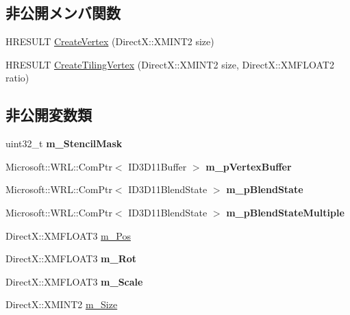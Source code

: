 \subsection*{非公開メンバ関数}
\begin{DoxyCompactItemize}
\item 
H\+R\+E\+S\+U\+LT \hyperlink{class_a_p_i_1_1_sprite_a8629113e859e0772382f67b6de6036bc}{Create\+Vertex} (Direct\+X\+::\+X\+M\+I\+N\+T2 size)
\item 
H\+R\+E\+S\+U\+LT \hyperlink{class_a_p_i_1_1_sprite_acc51e83897641c917cf8e2883519bd7c}{Create\+Tiling\+Vertex} (Direct\+X\+::\+X\+M\+I\+N\+T2 size, Direct\+X\+::\+X\+M\+F\+L\+O\+A\+T2 ratio)
\end{DoxyCompactItemize}
\subsection*{非公開変数類}
\begin{DoxyCompactItemize}
\item 
uint32\+\_\+t {\bfseries m\+\_\+\+Stencil\+Mask}\hypertarget{class_a_p_i_1_1_sprite_a14c9f660773821f8d9005b415e1b9c78}{}\label{class_a_p_i_1_1_sprite_a14c9f660773821f8d9005b415e1b9c78}

\item 
Microsoft\+::\+W\+R\+L\+::\+Com\+Ptr$<$ I\+D3\+D11\+Buffer $>$ {\bfseries m\+\_\+p\+Vertex\+Buffer}\hypertarget{class_a_p_i_1_1_sprite_aefe7709234a1ba240773c9794032a88c}{}\label{class_a_p_i_1_1_sprite_aefe7709234a1ba240773c9794032a88c}

\item 
Microsoft\+::\+W\+R\+L\+::\+Com\+Ptr$<$ I\+D3\+D11\+Blend\+State $>$ {\bfseries m\+\_\+p\+Blend\+State}\hypertarget{class_a_p_i_1_1_sprite_a63001d1ec2d9ac02687c99306af4a07f}{}\label{class_a_p_i_1_1_sprite_a63001d1ec2d9ac02687c99306af4a07f}

\item 
Microsoft\+::\+W\+R\+L\+::\+Com\+Ptr$<$ I\+D3\+D11\+Blend\+State $>$ {\bfseries m\+\_\+p\+Blend\+State\+Multiple}\hypertarget{class_a_p_i_1_1_sprite_a05d37dc5f363ce48454bc3bd9b508d9f}{}\label{class_a_p_i_1_1_sprite_a05d37dc5f363ce48454bc3bd9b508d9f}

\item 
Direct\+X\+::\+X\+M\+F\+L\+O\+A\+T3 \hyperlink{class_a_p_i_1_1_sprite_ac4dfe78085ef0a056c1ec0b18bbf894b}{m\+\_\+\+Pos}
\item 
Direct\+X\+::\+X\+M\+F\+L\+O\+A\+T3 {\bfseries m\+\_\+\+Rot}\hypertarget{class_a_p_i_1_1_sprite_a90e58aea364e265ec25080e06f3e6c3f}{}\label{class_a_p_i_1_1_sprite_a90e58aea364e265ec25080e06f3e6c3f}

\item 
Direct\+X\+::\+X\+M\+F\+L\+O\+A\+T3 {\bfseries m\+\_\+\+Scale}\hypertarget{class_a_p_i_1_1_sprite_ad778260919c8cf3a968b962f588ca7a5}{}\label{class_a_p_i_1_1_sprite_ad778260919c8cf3a968b962f588ca7a5}

\item 
Direct\+X\+::\+X\+M\+I\+N\+T2 \hyperlink{class_a_p_i_1_1_sprite_adb6dc678fde02000203c71a186713543}{m\+\_\+\+Size}
\end{DoxyCompactItemize}
